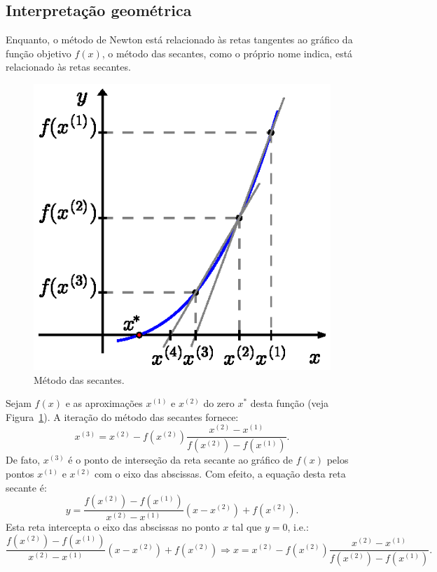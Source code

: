 \subsection{Interpretação geométrica}

Enquanto, o método de Newton está relacionado às retas tangentes ao gráfico da função objetivo $f(x)$, o método das secantes, como o próprio nome indica, está relacionado às retas secantes.

\begin{figure}[h]
  \centering
  \includegraphics{./cap_equacao1d/pics/metodo_das_secantes/metodo_das_secantes.eps}
  \caption{Método das secantes.}
  \label{fig:metodo_das_secantes}
\end{figure}

Sejam $f(x)$ e as aproximações $x^{(1)}$ e $x^{(2)}$ do zero $x^*$ desta função (veja Figura~\ref{fig:metodo_das_secantes}). A iteração do método das secantes fornece:
\begin{equation*}
  x^{(3)} = x^{(2)} - f(x^{(2)})\frac{x^{(2)} - x^{(1)}}{f(x^{(2)}) - f(x^{(1)})}.
\end{equation*}
De fato, $x^{(3)}$ é o ponto de interseção da reta secante ao gráfico de $f(x)$ pelos pontos $x^{(1)}$ e $x^{(2)}$ com o eixo das abscissas. Com efeito, a equação desta reta secante é:
\begin{equation*}
  y = \frac{f(x^{(2)}) - f(x^{(1)})}{x^{(2)} - x^{(1)}}(x - x^{(2)}) + f(x^{(2)}).
\end{equation*}
Esta reta intercepta o eixo das abscissas no ponto $x$ tal que $y=0$, i.e.:
\begin{equation*}
  \frac{f(x^{(2)}) - f(x^{(1)})}{x^{(2)} - x^{(1)}}(x - x^{(2)}) + f(x^{(2)}) \Rightarrow x = x^{(2)} - f(x^{(2)})\frac{x^{(2)} - x^{(1)}}{f(x^{(2)}) - f(x^{(1)})}.
\end{equation*}


